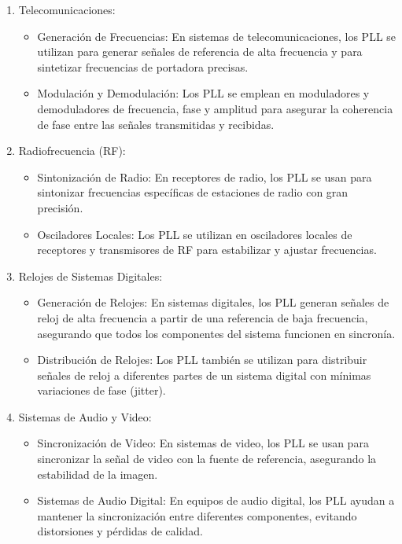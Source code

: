 \begin{enumerate} [label={\arabic*)}]
    \begin{enumerate}
        \item Telecomunicaciones:
        \begin{itemize}
            \item Generación de Frecuencias: En sistemas de telecomunicaciones, los PLL se utilizan para generar señales de referencia de alta frecuencia y para sintetizar frecuencias de portadora precisas.
            \item Modulación y Demodulación: Los PLL se emplean en moduladores y demoduladores de frecuencia, fase y amplitud para asegurar la coherencia de fase entre las señales transmitidas y recibidas.
        \end{itemize}
        \item Radiofrecuencia (RF):
        \begin{itemize}
            \item Sintonización de Radio: En receptores de radio, los PLL se usan para sintonizar frecuencias específicas de estaciones de radio con gran precisión.
            \item Osciladores Locales: Los PLL se utilizan en osciladores locales de receptores y transmisores de RF para estabilizar y ajustar frecuencias.
        \end{itemize}
        \item Relojes de Sistemas Digitales:
        \begin{itemize}
            \item Generación de Relojes: En sistemas digitales, los PLL generan señales de reloj de alta frecuencia a partir de una referencia de baja frecuencia, asegurando que todos los componentes del sistema funcionen en sincronía.
            \item Distribución de Relojes: Los PLL también se utilizan para distribuir señales de reloj a diferentes partes de un sistema digital con mínimas variaciones de fase (jitter).
        \end{itemize}
        \item Sistemas de Audio y Video:
        \begin{itemize}
            \item Sincronización de Video: En sistemas de video, los PLL se usan para sincronizar la señal de video con la fuente de referencia, asegurando la estabilidad de la imagen.
            \item Sistemas de Audio Digital: En equipos de audio digital, los PLL ayudan a mantener la sincronización entre diferentes componentes, evitando distorsiones y pérdidas de calidad.

\end{itemize}
\end{enumerate}
\end{enumerate}
